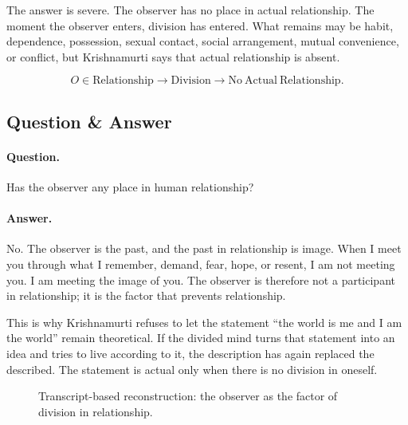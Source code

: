\documentclass[11pt,oneside]{book}
\begin{document}
The answer is severe. The observer has no place in actual relationship. The moment the observer enters, division has entered. What remains may be habit, dependence, possession, sexual contact, social arrangement, mutual convenience, or conflict, but Krishnamurti says that actual relationship is absent.

\begin{equation}
O \in \mathrm{Relationship}
\longrightarrow
\mathrm{Division}
\longrightarrow
\mathrm{No\ Actual\ Relationship}.
\end{equation}

\subsection{Question \& Answer}

\paragraph{Question.}
Has the observer any place in human relationship?

\paragraph{Answer.}
No. The observer is the past, and the past in relationship is image. When I meet you through what I remember, demand, fear, hope, or resent, I am not meeting you. I am meeting the image of you. The observer is therefore not a participant in relationship; it is the factor that prevents relationship.

This is why Krishnamurti refuses to let the statement ``the world is me and I am the world'' remain theoretical. If the divided mind turns that statement into an idea and tries to live according to it, the description has again replaced the described. The statement is actual only when there is no division in oneself.

\begin{figure}
\centering
{}

Transcript-based reconstruction: the observer as the factor of division in relationship.
\end{figure}
\end{document}
